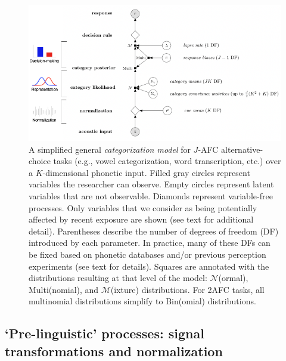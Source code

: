 \documentclass[
  11pt,
  man,floatsintext]{apa6}
\begin{document}
\begin{figure}[h]
\begin{center}
\includegraphics[width=.9\columnwidth]{../figures/diagrams/graphical-model.png}
  \caption{A simplified general {\em categorization model} for $J$-AFC alternative-choice tasks (e.g., vowel categorization, word transcription, etc.) over a $K$-dimensional phonetic input. Filled gray circles represent variables the researcher can observe. Empty circles represent latent variables that are not observable. Diamonds represent variable-free processes. Only variables that we consider as being potentially affected by recent exposure are shown (see text for additional detail). Parentheses describe the number of degrees of freedom (DF) introduced by each parameter. In practice, many of these DFs can be fixed based on phonetic databases and/or previous perception experiments (see text for details). Squares are annotated with the distributions resulting at that level of the model: $\mathcal{N}$(ormal), Multi(nomial), and $\mathcal{M}$(ixture) distributions. For 2AFC tasks, all multinomial distributions simplify to Bin(omial) distributions.} \label{fig:model-perceptual-decision-making}
\end{center}
\end{figure}

\hypertarget{pre-linguistic-processes-signal-transformations-and-normalization}{%
\subsection{`Pre-linguistic' processes: signal transformations and normalization}\label{pre-linguistic-processes-signal-transformations-and-normalization}}
\end{document}
